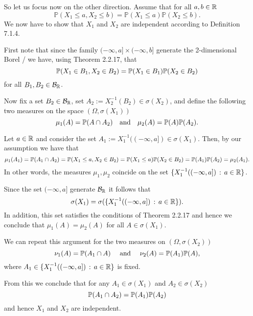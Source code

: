 So let us focus now on the other direction. Assume that for all $a,b \in \mathbb R$
\[
	\mathbb{P}(X_1 \le a, X_2 \le b) = \mathbb{P}(X_1 \le a) \mathbb{P}(X_2 \le b).
\]
We now have to show that $X_1$ and $X_2$ are independent according to Definition 7.1.4.

First note that since the family $(-\infty, a] \times (-\infty ,b]$ generate the 2-dimensional Borel \sigalg/ we have, using Theorem 2.2.17, that
\[
	\mathbb P(X_1 \in B_1, X_2 \in B_2) = \mathbb P(X_1 \in B_1) \mathbb P(X_2 \in B_2)
\]
for all $B_1, B_2 \in \mathcal B_{\mathbb R}$.

Now fix a set $B_2 \in \mathcal B_{\mathbb R}$, set $A_2 := X_2^{-1}(B_2) \in \sigma(X_2)$, and define the following two measures on the space $(\Omega, \sigma(X_1))$
\[
	\mu_1(A) = \mathbb P(A \cap A_2) \quad \text{and} \quad \mu_2(A) = \mathbb P(A)\mathbb P(A_2).
\]  

Let $a \in \mathbb R$ and consider the set $A_1 := X_1^{-1}((-\infty ,a]) \in \sigma(X_1)$. Then, by our assumption we have that
\[
	\mu_1(A_1) = \mathbb P(A_1 \cap A_2) = \mathbb P(X_1 \le a, X_2 \in B_2) = \mathbb P(X_1 \le a) \mathbb P(X_2 \in B_2) = \mathbb P(A_1) \mathbb P(A_2)
	= \mu_2(A_1).
\]
In other words, the measures $\mu_1, \mu_2$ coincide on the set $\{X_1^{-1}((-\infty, a]) \, : \, a \in \mathbb R\}$.

Since the set $(-\infty,a]$ generate $\mathcal B_{\mathbb R}$ it follows that 
\[
	\sigma(X_1) = \sigma(\{X_1^{-1}((-\infty, a]) \, : \, a \in \mathbb R\}).
\]
In addition, this set satisfies the conditions of Theorem 2.2.17 and hence we conclude that $\mu_1(A) = \mu_2(A)$ for all $A \in \sigma(X_1)$.

We can repeat this argument for the two measures on $(\Omega, \sigma(X_2))$
\[
	\nu_1(A) = \mathbb P(A_1 \cap A) \quad \text{ and } \quad \nu_2(A) = \mathbb P(A_1) \mathbb P(A), 
\]
where $A_1 \in \{X_1^{-1}((-\infty, a]) \, : \, a \in \mathbb R\}$ is fixed. 

From this we conclude that for any $A_1 \in \sigma(X_1)$ and $A_2 \in \sigma(X_2)$
\[
	\mathbb P(A_1 \cap A_2) = \mathbb P(A_1)\mathbb P(A_2)
\]
and hence $X_1$ and $X_2$ are independent.